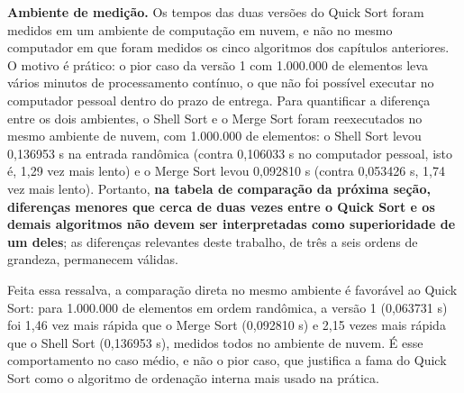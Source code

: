 \qquad \textbf{Ambiente de medição.} Os tempos das duas versões do
Quick Sort foram medidos em um ambiente de computação em nuvem, e não
no mesmo computador em que foram medidos os cinco algoritmos dos
capítulos anteriores. O motivo é prático: o pior caso da versão 1 com
1.000.000 de elementos leva vários minutos de processamento contínuo,
o que não foi possível executar no computador pessoal dentro do prazo
de entrega. Para quantificar a diferença entre os dois ambientes, o
Shell Sort e o Merge Sort foram reexecutados no mesmo ambiente de
nuvem, com 1.000.000 de elementos: o Shell Sort levou 0,136953 s na
entrada randômica (contra 0,106033 s no computador pessoal, isto é,
1,29 vez mais lento) e o Merge Sort levou 0,092810 s (contra
0,053426 s, 1,74 vez mais lento). Portanto, \textbf{na tabela de
comparação da próxima seção, diferenças menores que cerca de duas
vezes entre o Quick Sort e os demais algoritmos não devem ser
interpretadas como superioridade de um deles}; as diferenças
relevantes deste trabalho, de três a seis ordens de grandeza,
permanecem válidas.

\qquad Feita essa ressalva, a comparação direta no mesmo ambiente é
favorável ao Quick Sort: para 1.000.000 de elementos em ordem
randômica, a versão 1 (0,063731 s) foi 1,46 vez mais rápida que o
Merge Sort (0,092810 s) e 2,15 vezes mais rápida que o Shell Sort
(0,136953 s), medidos todos no ambiente de nuvem. É esse
comportamento no caso médio, e não o pior caso, que justifica a fama
do Quick Sort como o algoritmo de ordenação interna mais usado na
prática.
